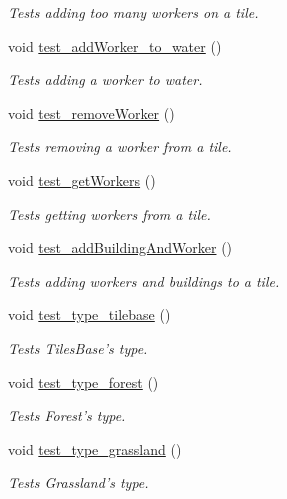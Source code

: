 \begin{DoxyCompactItemize}
\begin{DoxyCompactList}\small\item\em Tests adding too many workers on a tile. \end{DoxyCompactList}\item 
void \hyperlink{classdefault__tile_a29665a14d12c952675435a9bd642bc06}{test\-\_\-add\-Worker\-\_\-to\-\_\-water} ()
\begin{DoxyCompactList}\small\item\em Tests adding a worker to water. \end{DoxyCompactList}\item 
void \hyperlink{classdefault__tile_aee9fffb30a5ca5435a5421c548b1f9e5}{test\-\_\-remove\-Worker} ()
\begin{DoxyCompactList}\small\item\em Tests removing a worker from a tile. \end{DoxyCompactList}\item 
void \hyperlink{classdefault__tile_a57d1f35c44e5c82d4ca2878795fb0890}{test\-\_\-get\-Workers} ()
\begin{DoxyCompactList}\small\item\em Tests getting workers from a tile. \end{DoxyCompactList}\item 
void \hyperlink{classdefault__tile_a917f002ab0713044a752be2f6a37d6ff}{test\-\_\-add\-Building\-And\-Worker} ()
\begin{DoxyCompactList}\small\item\em Tests adding workers and buildings to a tile. \end{DoxyCompactList}\item 
void \hyperlink{classdefault__tile_a2fa5ec48fde3f3ba7952d364c179ad65}{test\-\_\-type\-\_\-tilebase} ()
\begin{DoxyCompactList}\small\item\em Tests Tiles\-Base's type. \end{DoxyCompactList}\item 
void \hyperlink{classdefault__tile_abc9cdbb32628185b44a1610454054da7}{test\-\_\-type\-\_\-forest} ()
\begin{DoxyCompactList}\small\item\em Tests Forest's type. \end{DoxyCompactList}\item 
void \hyperlink{classdefault__tile_a5383699e1c9a86e7414cd477b922fbd5}{test\-\_\-type\-\_\-grassland} ()
\begin{DoxyCompactList}\small\item\em Tests Grassland's type. \end{DoxyCompactList}\item 

\end{DoxyCompactItemize}
